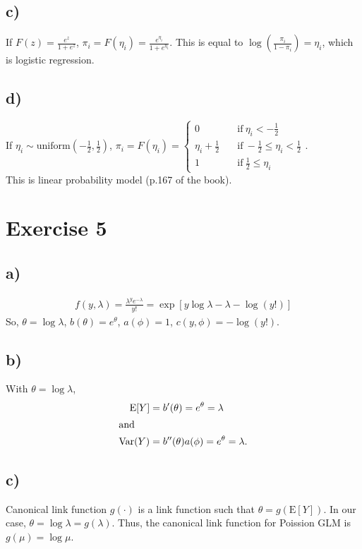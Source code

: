 \documentclass[a4paper]{article}
\newcommand{\E}{\mathrm{E}}
\newcommand{\Var}{\mathrm{Var}}
\begin{document}
\subsection{c)}
If $F(z) = \frac{e^{z}}{1+e^{z}}$, $\pi_{i} = F\left(\eta_{i}\right) = \frac{e^{\eta_{i}}}{1+e^{\eta_{i}}}$. This is equal to $\log\left(\frac{\pi_{i}}{1-\pi_{i}} \right) = \eta_{i}$, which is logistic regression.


\subsection{d)}
If $\eta_{i} \sim \mathrm{uniform}\left(-\frac{1}{2},\frac{1}{2}\right)$, $\pi_{i} = F\left(\eta_{i}\right) =
\begin{cases}
0 & \quad \mbox{if}~ \eta_{i} < -\frac{1}{2}\\
\eta_{i} +\frac{1}{2} & \quad \mbox{if}~ -\frac{1}{2} \leq \eta_{i} < \frac{1}{2}\\
1 & \quad \mbox{if}~ \frac{1}{2} \leq \eta_{i}
\end{cases}.$\\
This is linear probability model (p.167 of the book).


\vspace{\baselineskip}
\section{Exercise 5}
\subsection{a)}
\begin{align*}
f(y,\lambda) = \frac{\lambda^{y}e^{-\lambda}}{y!} = \exp\left[y\log{\lambda} -\lambda -\log(y!) \right]
\end{align*}
So, $\theta = \log\lambda$, $b(\theta) = e^{\theta}$, $a(\phi) = 1$, $c(y,\phi) = -\log(y!)$.


\subsection{b)}
With $\theta = \log\lambda$,
\begin{align*}
\E[Y] &= b'(\theta) = e^{\theta} = \lambda\\ \intertext{and}
\Var(Y) &= b''(\theta) a(\phi) = e^{\theta} = \lambda.
\end{align*}

\subsection{c)}
Canonical link function $g(\cdot)$ is a link function such that $\theta = g\left(\E[Y] \right)$.
In our case, $\theta = \log\lambda  = g(\lambda)$. Thus, the canonical link function for Poission GLM is $g(\mu) = \log\mu$.
\end{document}
